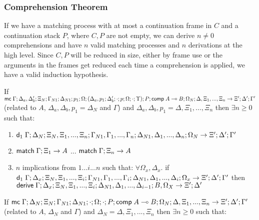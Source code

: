 \subsubsection{Comprehension Theorem}

If we have a matching process with at most a continuation frame in $C$ and a continuation stack $P$, where $C, P$ are not empty, we can derive $n \neq 0$ comprehensions and have $n$ valid matching processes and $n$ derivations at the high level. Since $C, P$ will be reduced in size, either by frame use or the arguments in the frames get reduced each time a comprehension is applied, we have a valid induction hypothesis.

\begin{theorem}
   If $\mathsf{mc} \; \Gamma; \Delta_a, \Delta'_b; \Xi_N; \Gamma_{N1}; \Delta_{N1}; p_1; \Omega; (\Delta_a, p_1; \Delta'_b; \cdot; p; \Omega; \cdot; \Upsilon); P; \mathsf{comp} \; A \multimap B; \Omega_N; \Delta, \Xi_1, ..., \Xi_n \rightarrow \Xi'; \Delta'; \Gamma'$ (related to $A$, $\Delta_a, \Delta_b, p_1 = \Delta_N$ and $\Gamma$) and $\Delta_a, \Delta_b, p_1 = \Delta, \Xi_1, ..., \Xi_n$  then $\exists n \geq 0$ such that:
   
   \begin{enumerate}
      \item $\mathsf{d}_1 \; \Gamma; \Delta_N; \Xi_N, \Xi_1, ..., \Xi_n; \Gamma_{N1}, \Gamma_1, ..., \Gamma_n; \Delta_{N1}, \Delta_1, ..., \Delta_n; \Omega_N \rightarrow \Xi'; \Delta'; \Gamma'$
      \item $\mathsf{match} \; \Gamma; \Xi_1 \rightarrow A$ ... $\mathsf{match} \; \Gamma; \Xi_n \rightarrow A$
      \item $n$ implications from $1...i...n$ such that: $\forall \Omega_x, \Delta_x.$ if $\mathsf{d}_1 \; \Gamma; \Delta_x; \Xi_N, \Xi_1, ..., \Xi_i; \Gamma_{N1}, \Gamma_1, ..., \Gamma_i; \Delta_{N1}, \Delta_1, ..., \Delta_i; \Omega_x \rightarrow \Xi'; \Delta'; \Gamma'$ then $\mathsf{derive} \; \Gamma; \Delta_x; \Xi_N, \Xi_1, ..., \Xi_i; \Delta_{N1}, \Delta_1, ..., \Delta_{i-1}; B, \Omega_X \rightarrow \Xi'; \Delta'$
   \end{enumerate}
   
   If $\mathsf{mc} \; \Gamma; \Delta_N; \Xi_N; \Gamma_{N1}; \Delta_{N1}; \cdot; \Omega; \cdot; P; \mathsf{comp} \; A \multimap B; \Omega_N; \Delta, \Xi_1, ..., \Xi_n \rightarrow \Xi'; \Delta'; \Gamma'$ (related to $A$, $\Delta_N$ and $\Gamma$) and $\Delta_N = \Delta, \Xi_1, ..., \Xi_n$ then $\exists n \geq 0$ such that:
   

\end{theorem}
